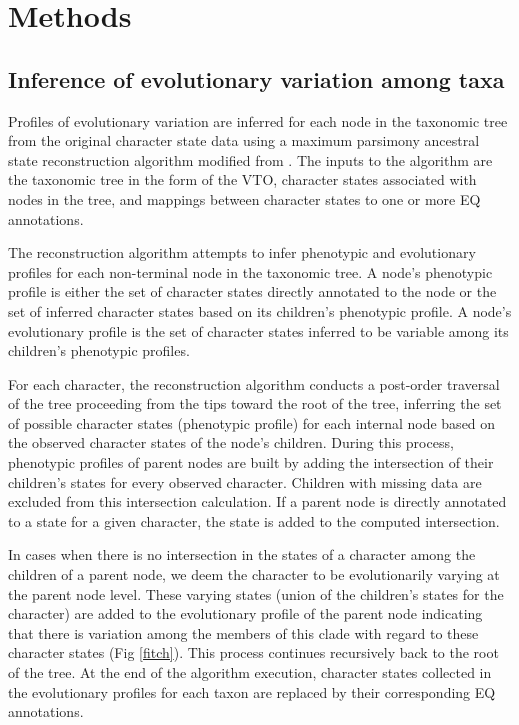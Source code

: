 \documentclass{article}
\begin{document}
\section{Methods}

\subsection{Inference of evolutionary variation among taxa}
Profiles of evolutionary variation are inferred for each node in the taxonomic tree from the original character state data using a maximum parsimony ancestral state reconstruction algorithm modified from \cite{fitch1971toward}. The inputs to the algorithm are the taxonomic tree in the form of the VTO, character states associated with nodes in the tree, and mappings between character states to one or more EQ annotations.

The reconstruction algorithm attempts to infer phenotypic and evolutionary profiles for each non-terminal node in the taxonomic tree. A node's phenotypic profile is either the set of character states directly annotated to the node or the set of inferred character states based on its children's phenotypic profile. A node's evolutionary profile is the set of character states inferred to be variable among its children's phenotypic profiles.   

For each character, the reconstruction algorithm conducts a post-order traversal of the tree proceeding from the tips toward the root of the tree, inferring the set of possible character states (phenotypic profile) for each internal node based on the observed character states of the node's children. During this process, phenotypic profiles of parent nodes are built by adding the intersection of their children's states for every observed character. Children with missing data are excluded from this intersection calculation. If a parent node is directly annotated to a state for a given character, the state is added to the computed intersection. 

In cases when there is no intersection in the states of a character among the children of a parent node, we deem the character to be evolutionarily varying at the parent node level. These varying states (union of the children's states for the character) are added to the evolutionary profile of the parent node indicating that there is variation among the members of this clade with regard to these character states (Fig \ref{fitch}). This process continues recursively back to the root of the tree. At the end of the algorithm execution, character states collected in the evolutionary profiles for each taxon are replaced by their corresponding EQ annotations. 
\end{document}
